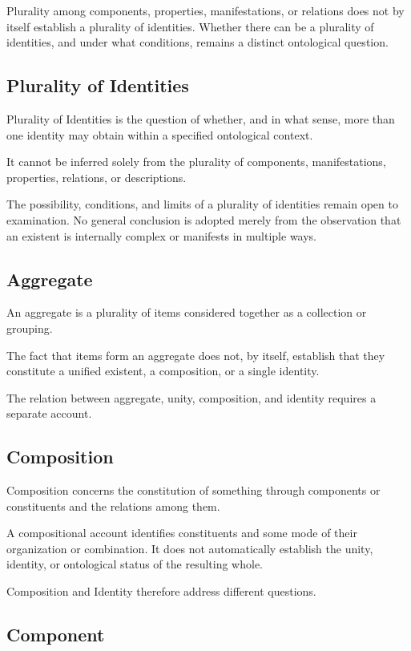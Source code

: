 Plurality among components, properties, manifestations, or relations
does not by itself establish a plurality of identities. Whether there
can be a plurality of identities, and under what conditions, remains
a distinct ontological question.


\subsection*{Plurality of Identities}

Plurality of Identities is the question of whether, and in what sense,
more than one identity may obtain within a specified ontological context.

It cannot be inferred solely from the plurality of components,
manifestations, properties, relations, or descriptions.

The possibility, conditions, and limits of a plurality of identities
remain open to examination. No general conclusion is adopted merely
from the observation that an existent is internally complex or
manifests in multiple ways.


\subsection*{Aggregate}

An aggregate is a plurality of items considered together as a collection
or grouping.

The fact that items form an aggregate does not, by itself, establish
that they constitute a unified existent, a composition, or a single
identity.

The relation between aggregate, unity, composition, and identity
requires a separate account.


\subsection*{Composition}

Composition concerns the constitution of something through components
or constituents and the relations among them.

A compositional account identifies constituents and some mode of their
organization or combination. It does not automatically establish
the unity, identity, or ontological status of the resulting whole.

Composition and Identity therefore address different questions.


\subsection*{Component}

